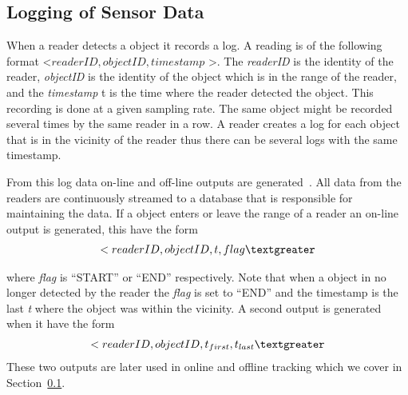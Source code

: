 \subsection{Logging of Sensor Data}
When a reader detects a object it records a log. 
A reading is of the following format \textless $readerID,objectID,timestamp$ \textgreater.
The \textit{readerID} is the identity of the reader, \textit{objectID} is the identity of the object which is in the range of the reader, and the \textit{timestamp} t is the time where the reader detected the object.
This recording is done at a given sampling rate. 
The same object might be recorded several times by the same reader in a row. 
A reader creates a log for each object that is in the vicinity of the reader thus there can be several logs with the same timestamp.

From this log data on-line and off-line outputs are generated~\cite{Jensen:2009:GMB:1590953.1591000}.
All data from the readers are continuously streamed to a database that is responsible for maintaining the data.
If a object enters or leave the range of a reader an on-line output is generated, this have the form
\begin{align}
\textless readerID,objectID,t,flag \textgreater 
\end{align}

where \textit{flag} is "`START"' or "`END"' respectively. 
Note that when a object in no longer detected by the reader  the \textit{flag} is set to "`END"' and the timestamp is the last \textit{t} where the object was within the vicinity.
A second output is generated when it have the form 
\begin{align}
\textless\textit{$readerID,objectID,t_{first},t_{last}$}\textgreater
\end{align}
These two outputs are later used in online and offline tracking which we cover in Section~\ref{}.

 

